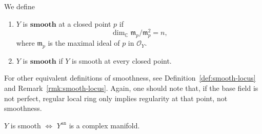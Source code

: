 \begin{definition} We define

    \begin{enumerate}
        \item $Y$ is $\textbf{smooth}$ at a closed point $p$ if $$\dim_{\mathbb{C}} \mathfrak{m}_p/\mathfrak{m}_p^2 = n,$$ where $\mathfrak{m}_p$ is the maximal ideal of $p$ in $\mathcal{O}_Y$.
        \item $Y$ is $\textbf{smooth}$ if $Y$ is smooth at every closed point.
    \end{enumerate}
\end{definition}
\begin{remark}
    For other equivalent definitions of smoothness, see Definition~\ref{def:smooth-locus} and Remark~\ref{rmk:smooth-locus}.
    Again, one should note that, if the base field is not perfect, regular local ring only implies regularity at that point, not smoothness.
\end{remark}
\begin{lemma}
    $Y$ is smooth $\iff$ $Y^{\mathrm{an}}$ is a complex manifold.
\end{lemma}
